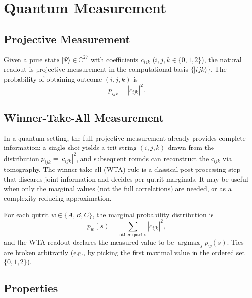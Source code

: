 \documentclass[12pt,a4paper]{article}
\begin{document}
\section{Quantum Measurement}

\subsection{Projective Measurement}

Given a pure state $|\Psi\rangle \in \mathbb{C}^{27}$ with coefficients
$c_{ijk}$ ($i,j,k \in \{0,1,2\}$), the natural readout is projective
measurement in the computational basis $\{|ijk\rangle\}$. The probability
of obtaining outcome $(i,j,k)$ is
\[
p_{ijk} = |c_{ijk}|^2.
\]

\subsection{Winner-Take-All Measurement}

In a quantum setting, the full projective measurement already provides
complete information: a single shot yields a trit string $(i,j,k)$
drawn from the distribution $p_{ijk} = |c_{ijk}|^2$, and subsequent
rounds can reconstruct the $c_{ijk}$ via tomography. The winner-take-all
(WTA) rule is a classical post-processing step that discards joint
information and decides per-qutrit marginals. It may be useful when
only the marginal values (not the full correlations) are needed, or as
a complexity-reducing approximation.

For each qutrit $w \in \{A,B,C\}$, the marginal probability distribution
is
\[
p_w(s) = \sum_{\text{other qutrits}} |c_{ijk}|^2,
\]
and the WTA readout declares the measured value to be
$\operatorname{argmax}_s p_w(s)$. Ties are broken arbitrarily (e.g., by
picking the first maximal value in the ordered set $\{0,1,2\}$).

\subsection{Properties}
\end{document}
